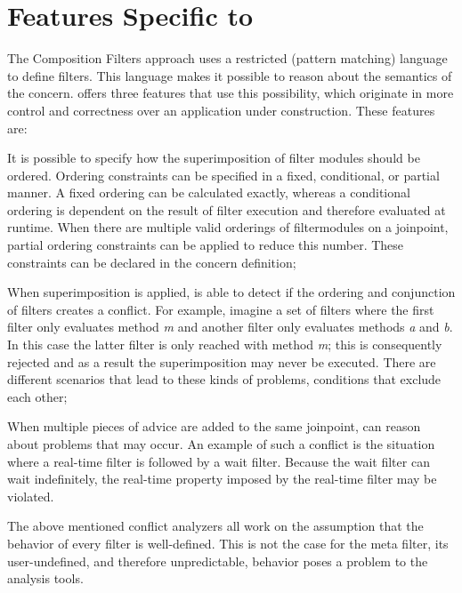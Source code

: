 \section{Features Specific to \Compose*{}}
\label{section:FSTC}
The Composition Filters approach uses a restricted (pattern matching) language to define filters. This language makes it possible to reason about the semantics of the concern. 
\Compose* offers three features that use this possibility, which originate in more control and correctness over an application under construction. These features are:
\begin{description}[style=nextline,noitemsep]
\item [Ordering of filter modules] It is possible to specify how the superimposition of filter modules should be ordered. Ordering constraints can be specified in a fixed, conditional, or partial manner. A fixed ordering can be calculated exactly, whereas a conditional ordering is dependent on the result of filter execution and therefore evaluated at runtime. When there are multiple valid orderings of filtermodules on a joinpoint, partial ordering constraints can be applied to reduce this number. These constraints can be declared in the concern definition;
\item [Filter consistency checking] When superimposition is applied, \Compose* is able to detect if the ordering and conjunction of filters creates a conflict. 
For example, imagine a set of filters where the first filter only evaluates method \emph{m} and another filter only evaluates methods \emph{a} and \emph{b}. 
In this case the latter filter is only reached with method \emph{m}; this is consequently rejected and as a result the superimposition may never be executed. There are different scenarios that lead to these kinds of problems, \eg conditions that exclude each other;
\item [Reason about semantic problems] When multiple pieces of advice are added to the same joinpoint, \Compose* can reason about problems that may occur.
An example of such a conflict is the situation where a real-time filter is followed by a wait filter. Because the wait filter can wait indefinitely, the real-time property imposed by the real-time filter may be violated.
\end{description}
The above mentioned conflict analyzers all work on the assumption that the behavior of every filter is well-defined. This is not the case for the meta filter, its user-undefined, and therefore unpredictable, behavior poses a problem to the analysis tools. 

